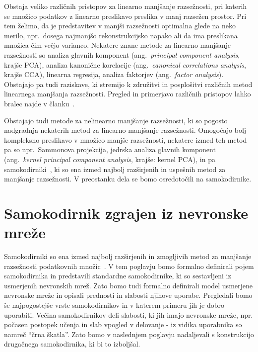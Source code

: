 \documentclass[12pt,a4paper,twoside]{article}
\theoremstyle{definition} %
\theoremstyle{plain} %
\numberwithin{equation}{section}  %
\begin{document}
Obstaja veliko različnih pristopov za linearno manjšanje razsežnosti, pri katerih se množico podatkov z linearno preslikavo preslika v manj razsežen prostor. 
Pri tem želimo, da je predstavitev v manjši razsežnosti optimalna glede na neko merilo, npr.\ dosega najmanjšo rekonstrukcijsko napako ali da ima preslikana množica čim večjo varianco. 
Nekatere znane metode za linearno manjšanje razsežnosti so analiza glavnih komponent (ang.~\textsl{principal component analysis}, krajše PCA), %
analiza kanonične korelacije (ang.~\textsl{canonical correlations analysis}, krajše CCA), linearna regresija, analiza faktorjev (ang.~\textsl{factor analysis}).
Obstajajo pa tudi raziskave, ki stremijo k združitvi in posplošitvi različnih metod linearnega manjšanja razsežnosti. 
Pregled in primerjavo različnih pristopov lahko bralec najde v članku~\cite{JMLR:cunningham2015a}.

Obstajajo tudi metode za nelinearno manjšanje razsežnosti, ki so pogosto nadgradnja nekaterih metod za linearno manjšanje razsežnosti. 
Omogočajo bolj kompleksno preslikavo v množico manjše razsežnosti, nekatere izmed teh metod pa so npr.\ Sammonova projekcija, 
jedrska analiza glavnih komponent (ang.~\textsl{kernel principal component analysis}, krajše: kernel PCA), in pa samokodirniki~\cite{charte2018autoencoders}, ki so ena izmed najbolj razširjenih in uspešnih metod za manjšanje razsežnosti. 
V preostanku dela se bomo osredotočili na samokodirnike.



\section{Samokodirnik zgrajen iz nevronske mreže} %
\label{pogl:nn_samokodirniki}

Samokodirniki so ena izmed najbolj razširjenih in zmogljivih metod za manjšanje razsežnosti podatkovnih množic~\cite{charte2018autoencoders}.
V tem poglavju bomo formalno definirali pojem samokodirnika in predstavili standardne samokodirnike, ki so sestavljeni iz usmerjenih nevronskih mrež.
Zato bomo tudi formalno definirali model usmerjene nevronske mreže in opisali prednosti in slabosti njihove uporabe.
Pregledali bomo še najpogostejše vrste samokodirnikov in v katerem primeru jih je dobro uporabiti.
Večina samokodirnikov deli slabosti, ki jih imajo nevronske mreže, npr. počasen postopek učenja in slab vpogled v delovanje - iz vidika uporabnika so namreč ``črna škatla''.
Zato bomo v naslednjem poglavju nadaljevali s konstrukcijo drugačnega samokodirnika, ki bi to izboljšal.
\end{document}
